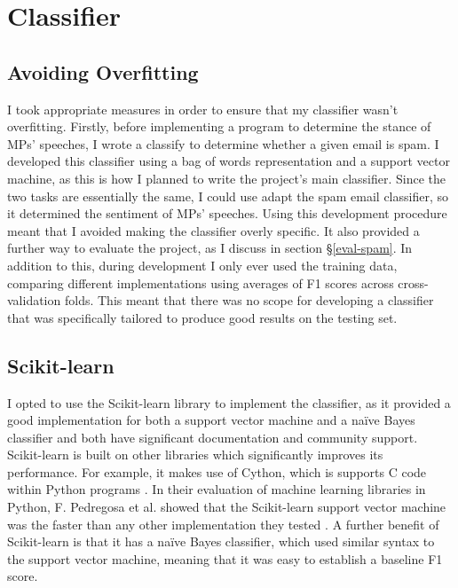 \documentclass[12pt,a4paper,twoside,openright]{report}
\begin{document}
\section{Classifier} \label{impl-classifier}

\subsection{Avoiding Overfitting} \label{impl-overfitting}

I took appropriate measures in order to ensure that my classifier wasn't overfitting. Firstly, before implementing a program to determine the stance of MPs' speeches, I wrote a classify to determine whether a given email is spam. I developed this classifier using a bag of words representation and a support vector machine, as this is how I planned to write the project's main classifier. Since the two tasks are essentially the same, I could use adapt the spam email classifier, so it determined the sentiment of MPs' speeches. Using this development procedure meant that I avoided making the classifier overly specific. It also provided a further way to evaluate the project, as I discuss in section \S\ref{eval-spam}. In addition to this, during development I only ever used the training data, comparing different implementations using averages of F1 scores across cross-validation folds. This meant that there was no scope for developing a classifier that was specifically tailored to produce good results on the testing set.

\subsection{Scikit-learn}

I opted to use the Scikit-learn library to implement the classifier, as it provided a good implementation for both a support vector machine and a na\"{i}ve Bayes classifier and both have significant documentation \cite{svmdocs, nbcdocs} and community support. Scikit-learn is built on other libraries which significantly improves its performance. For example, it makes use of Cython, which is supports C code within Python programs \cite{cythondocs}. In their evaluation of machine learning libraries in Python, F. Pedregosa et al. showed that the Scikit-learn support vector machine was the faster than any other implementation they tested \cite{skspeed}. A further benefit of Scikit-learn is that it has a na\"{i}ve Bayes classifier, which used similar syntax to the support vector machine, meaning that it was easy to establish a baseline F1 score.
\end{document}
